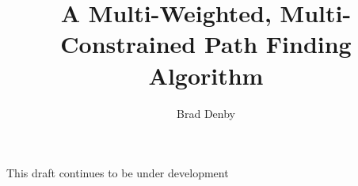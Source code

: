 \documentclass[12pt]{amsart}
\theoremstyle{definition}
\theoremstyle{remark}
\numberwithin{equation}{section}
\begin{document}
\title{A Multi-Weighted, Multi-Constrained Path Finding Algorithm}

\author{Brad Denby}

\maketitle

This draft continues to be under development
\end{document}
